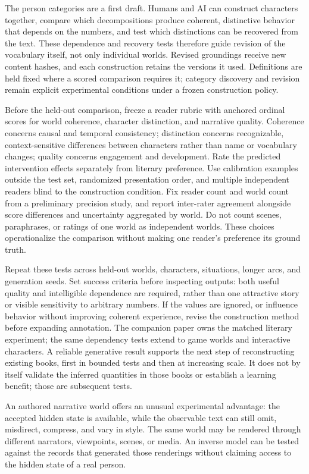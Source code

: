 \documentclass[10pt]{article}
\begin{document}
The person categories are a first draft. Humans and AI can construct
characters together, compare which decompositions produce coherent,
distinctive behavior that depends on the numbers, and test which distinctions
can be recovered from the text. These dependence and recovery tests therefore
guide revision of the vocabulary itself, not only individual worlds.
Revised groundings receive new content hashes, and each construction retains
the versions it used. Definitions are held fixed where a scored comparison
requires it; category discovery and revision remain explicit experimental
conditions under a frozen construction policy.

Before the held-out comparison, freeze a reader rubric with anchored ordinal
scores for world coherence, character distinction, and narrative quality.
Coherence concerns causal and temporal consistency; distinction concerns
recognizable, context-sensitive differences between characters rather than
name or vocabulary changes; quality concerns engagement and development.
Rate the predicted intervention effects separately from literary preference.
Use calibration examples outside the test set, randomized presentation order,
and multiple independent readers blind to the construction condition. Fix
reader count and world count from a preliminary precision study, and report
inter-rater agreement alongside score differences and uncertainty aggregated
by world. Do not count scenes, paraphrases, or ratings of one world as
independent worlds. These choices operationalize the comparison without
making one reader's preference its ground truth.

Repeat these tests across held-out worlds, characters, situations, longer arcs, and
generation seeds. Set success criteria before inspecting outputs: both useful
quality and intelligible dependence are required, rather than one attractive
story or visible sensitivity to arbitrary numbers. If the values are ignored,
or influence behavior without improving coherent experience, revise the
construction method before expanding annotation. The companion paper owns
the matched literary experiment; the same dependency tests extend to game
worlds and interactive characters. A reliable generative result supports the
next step of reconstructing existing books, first in bounded tests and then
at increasing scale. It does not by itself validate the inferred quantities
in those books or establish a learning benefit; those are subsequent tests.

An authored narrative world offers an unusual experimental advantage: the
accepted hidden state is available, while the observable text can still omit,
misdirect, compress, and vary in style. The same world may be rendered through
different narrators, viewpoints, scenes, or media. An inverse model can be
tested against the records that generated those renderings without claiming
access to the hidden state of a real person.
\end{document}
